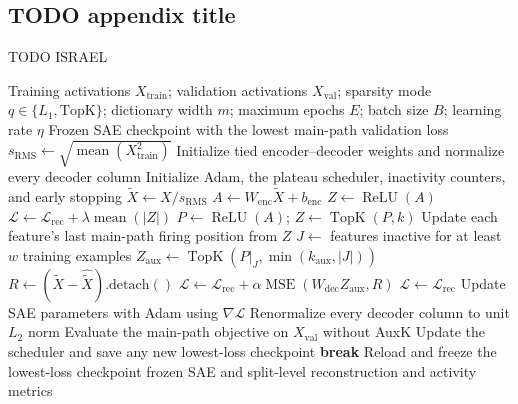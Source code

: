 \documentclass[pdflatex,sn-mathphys-num]{sn-jnl}
\theoremstyle{thmstylethree}%
\begin{document}
\begin{appendices}

\section{TODO appendix title}\label{secA1}

TODO ISRAEL


\begin{algorithm}[H]
\caption{Custom L1 or TopK--AuxK SAE training}
\label{alg:custom-sae-training}
\begin{algorithmic}[1]
\Require Training activations $X_{\mathrm{train}}$; validation activations $X_{\mathrm{val}}$;
sparsity mode $q\in\{L_1,\mathrm{TopK}\}$; dictionary width $m$; maximum epochs $E$;
batch size $B$; learning rate $\eta$
\Ensure Frozen SAE checkpoint with the lowest main-path validation loss
\State $s_{\mathrm{RMS}}\gets\sqrt{\operatorname{mean}(X_{\mathrm{train}}^2)}$
\State Initialize tied encoder--decoder weights and normalize every decoder column
\State Initialize Adam, the plateau scheduler, inactivity counters, and early stopping
        \State $\widetilde{X}\gets X/s_{\mathrm{RMS}}$
        \State $A\gets W_{\mathrm{enc}}\widetilde{X}+b_{\mathrm{enc}}$
            \State $Z\gets\operatorname{ReLU}(A)$
            \State $\mathcal{L}\gets\mathcal{L}_{\mathrm{rec}}+\lambda\operatorname{mean}(|Z|)$
        \Else
            \State $P\gets\operatorname{ReLU}(A)$; $Z\gets\operatorname{TopK}(P,k)$
            \State Update each feature's last main-path firing position from $Z$
            \State $J\gets$ features inactive for at least $w$ training examples
                \State $Z_{\mathrm{aux}}\gets
                \operatorname{TopK}(P|_J,\min(k_{\mathrm{aux}},|J|))$
                \State $R\gets(\widetilde{X}-\widehat{\widetilde{X}})\text{.detach}()$
                \State $\mathcal{L}\gets\mathcal{L}_{\mathrm{rec}}+
                \alpha\operatorname{MSE}(W_{\mathrm{dec}}Z_{\mathrm{aux}},R)$
            \Else
                \State $\mathcal{L}\gets\mathcal{L}_{\mathrm{rec}}$
            \EndIf
        \EndIf
        \State Update SAE parameters with Adam using $\nabla\mathcal{L}$
        \State Renormalize every decoder column to unit $L_2$ norm
    \EndFor
    \State Evaluate the main-path objective on $X_{\mathrm{val}}$ without AuxK
    \State Update the scheduler and save any new lowest-loss checkpoint
        \State \textbf{break}
    \EndIf
\EndFor
\State Reload and freeze the lowest-loss checkpoint
\State \Return frozen SAE and split-level reconstruction and activity metrics
\end{algorithmic}
\end{algorithm}



\end{appendices}
\end{document}
